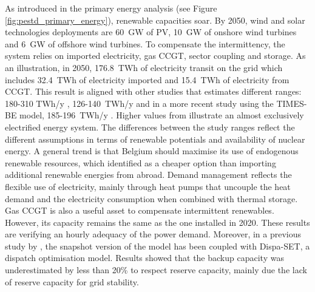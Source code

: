 As introduced in the primary energy analysis (see Figure \ref{fig:pestd_primary_energy}), renewable capacities soar. By 2050, wind and solar technologies deployments are 60~GW of \gls{PV}, 10~GW of onshore wind turbines and 6~GW of offshore wind turbines. To compensate the intermittency, the system relies on imported electricity, gas \gls{CCGT}, sector coupling and storage. As an illustration, in 2050, 176.8~TWh of electricity transit on the grid which includes 32.4~TWh of electricity imported and 15.4~TWh of electricity from \gls{CCGT}. This result is aligned with other studies that estimates different ranges: 180-310 TWh/y \cite{Devogelaer2013}, 126-140~TWh/y \cite{My2050} and in a more recent study 
using the TIMES-BE model, 185-196~TWh/y \cite{PATHS2050}. Higher values from \citet{Devogelaer2013} illustrate an almost exclusively electrified energy system. The differences between the study ranges reflect the different assumptions in terms of renewable potentials and availability of nuclear energy. A general trend is that Belgium should maximise its use of endogenous renewable resources, which \citet{dubois2023multi} identified as a cheaper option than importing additional renewable energies from abroad. Demand management reflects the flexible use of electricity, mainly through heat pumps that uncouple the heat demand and the electricity consumption when combined with thermal storage. Gas \gls{CCGT} is also a useful asset to compensate intermittent renewables. However, its capacity remains the same as the one installed in 2020. These results are verifying an hourly adequacy of the power demand. Moreover, in a previous study by \citet{pavivcevic2022bidirectionnal}, the snapshot version of the model has been coupled with Dispa-SET, a dispatch optimisation model. Results showed that the backup capacity was underestimated by less than 20\% to respect reserve capacity, mainly due the lack of reserve capacity for grid stability.  

